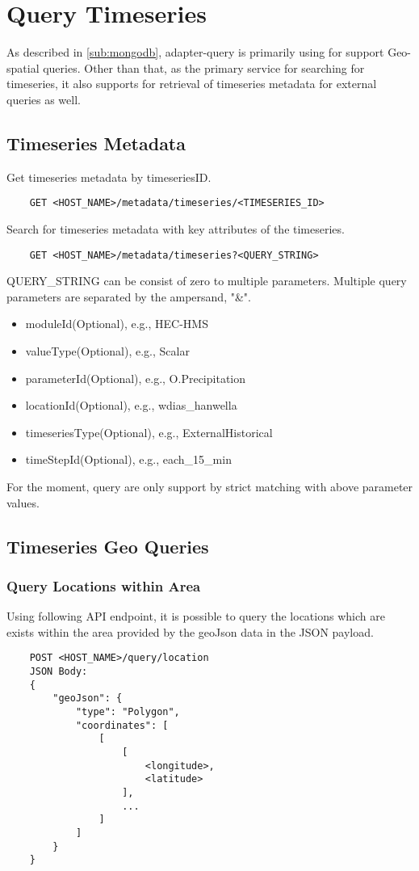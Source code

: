 \section{Query Timeseries}

As described in  \ref{sub:mongodb}, adapter-query is primarily using for support Geo-spatial queries. Other than that, as the primary service for searching for timeseries, it also supports for retrieval of timeseries metadata for external queries as well.

\subsection{Timeseries Metadata}
Get timeseries metadata by timeseriesID.
\begin{lstlisting}
    GET <HOST_NAME>/metadata/timeseries/<TIMESERIES_ID>
\end{lstlisting}

Search for timeseries metadata with key attributes of the timeseries.
\begin{lstlisting}
    GET <HOST_NAME>/metadata/timeseries?<QUERY_STRING>
\end{lstlisting}
QUERY\_STRING can be consist of zero to multiple parameters. Multiple query parameters are separated by the ampersand, "\&".
\begin{itemize}
    \item moduleId(Optional), e.g., HEC-HMS
    \item valueType(Optional), e.g., Scalar
    \item parameterId(Optional), e.g., O.Precipitation
    \item locationId(Optional), e.g., wdias\_hanwella
    \item timeseriesType(Optional), e.g., ExternalHistorical
    \item timeStepId(Optional), e.g., each\_15\_min
\end{itemize}
For the moment, query are only support by strict matching with above parameter values.

\subsection{Timeseries Geo Queries}

\subsubsection{Query Locations within Area}
Using following API endpoint, it is possible to query the locations which are exists within the area provided by the geoJson data in the JSON payload.
\begin{lstlisting}
    POST <HOST_NAME>/query/location
    JSON Body:
    {
        "geoJson": {
            "type": "Polygon",
            "coordinates": [
                [
                    [
                        <longitude>,
                        <latitude>
                    ],
                    ...
                ]
            ]
        }
    }
\end{lstlisting}

